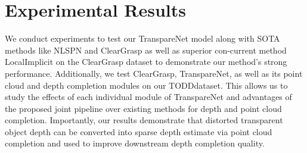 \documentclass{article}
\newcommand{\algoName}{TranspareNet\xspace}
\newcommand{\dataName}{TODD}
\begin{document}
\begin{table}[!t]
{\begin{tabular}{c|c|c|c|c|c|c}
	\bottomrule
\end{tabular}
}
\end{table}


\section{Experimental Results}
\label{sec:Experiments}
We conduct experiments to test our \algoName model along with SOTA methods like NLSPN \citep{park2020nonlocal} and ClearGrasp\citep{ClearGrasp} as well as superior con-current method LocalImplicit \citep{zhu2021rgbd} on the ClearGrasp \citep{ClearGrasp} dataset to demonstrate our method's strong performance. Additionally, we test ClearGrasp, \algoName, as well as its point cloud and depth completion modules on our \dataName dataset. This allows us to study the effects of each individual module of \algoName and advantages of the proposed joint pipeline over existing methods for depth and point cloud completion. Importantly, our results demonstrate that distorted transparent object depth can be converted into sparse depth estimate via point cloud completion and used to improve downstream depth completion quality.
\end{document}
